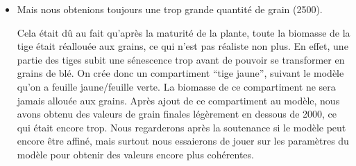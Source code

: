 \begin{itemize}
	\item Mais nous obtenions toujours une trop grande quantité de grain (2500). 

Cela était dû au fait qu'après la maturité de la plante, toute la biomasse de la tige était réallouée aux grains, ce qui n'est pas réaliste non plus. En effet, une partie des tiges subit une sénescence trop avant de pouvoir se transformer en grains de blé. On crée donc un compartiment ``tige jaune'', suivant le modèle qu'on a feuille jaune/feuille verte. La biomasse de ce compartiment ne sera jamais allouée aux grains.
Après ajout de ce compartiment au modèle, nous avons obtenu des valeurs de grain finales légèrement en dessous de 2000, ce qui était encore trop. 
Nous regarderons après la soutenance si le modèle peut encore être affiné, mais surtout nous essaierons de jouer sur les paramètres du modèle pour obtenir des valeurs encore plus cohérentes.


\end{itemize}

